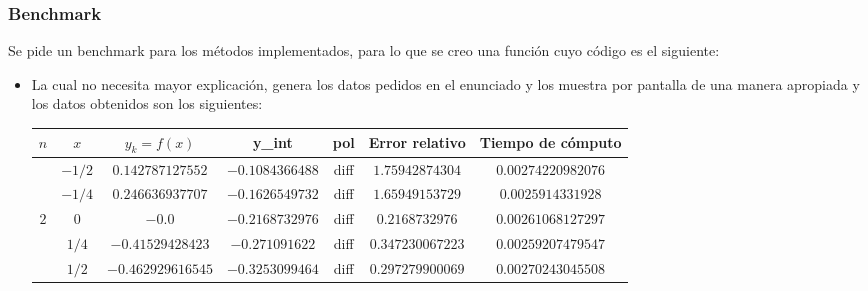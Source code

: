 \documentclass[letter, 10pt]{article}
\begin{document}
\subsubsection{Benchmark} Se pide un benchmark para los m\'etodos implementados, para lo que se creo una funci\'on cuyo c\'odigo es el siguiente:
\begin{itemize}
\begin{python}
def benchmark():
    
    X = [-0.5,-0.25,0.0,0.25,0.5]
    interp_methods = ['diff','spl']
    
    for m in range(1,6):
        for j in interp_methods:
            for i in X:
                
                n = 2**m
                y_real = get_Yreal(i)
                y_int = inter_pol(i,n,j)
                
                if y_real != 0:
                    error_rel = abs((y_real - y_int)/y_real)
                else:
                    error_rel = abs(y_real - y_int)
                
                comp_time = t.timeit("inter_pol(x_int,n,pol)",setup='x_int='+str(i)+'; 
n='+str(n)+'; pol="'+j+'"; from __main__ import inter_pol',number=10)
\end{python}

\newpage

\begin{python}
                if y_real == 0:
                    print 'N:',n,' X:',i,' Y_k:',y_real,'            Y_int:',y_int,' pol:',j
,' Error Relativo:',error_rel,' Tiempo de computo:',comp_time
                else:
                    print 'N:',n,' X:',i,' Y_k:',y_real,' Y_int:',y_int,' pol:',j
,' Error Relativo:',error_rel,' Tiempo de computo:',comp_time
                    
            print ''
\end{python}
\item La cual no necesita mayor explicaci\'on, genera los datos pedidos en el enunciado y los muestra por pantalla de una manera apropiada y los datos obtenidos son los siguientes:

\begin{center}
	\begin{tabular}{|c|c|c|c|c|c|c|}
		\hline
		$n$ & $x$ & $y_k = f(x)$ & y\_int & pol & \textbf{Error relativo} & \textbf{Tiempo de c\'omputo} \\
		\hline \hline
		
			& $ -1/2 $ & $ 0.142787127552 $ & $ -0.1084366488 $ &  diff  & $ 1.75942874304 $ & $ 0.00274220982076 $ \\ 
			& $ -1/4 $ & $ 0.246636937707 $ & $ -0.1626549732 $ &  diff  & $ 1.65949153729 $ & $ 0.0025914331928 $ \\ 
		$2$ & $ 0 $ & $ -0.0 $ & $ -0.2168732976 $ &  diff  & $ 0.2168732976 $ & $ 0.00261068127297 $ \\ 
			& $ 1/4 $ & $ -0.41529428423 $ & $ -0.271091622 $ &  diff  & $ 0.347230067223 $ & $ 0.00259207479547 $ \\ 
			& $ 1/2 $ & $ -0.462929616545 $ & $ -0.3253099464 $ &  diff  & $ 0.297279900069 $ & $ 0.00270243045508 $ \\
		\hline
		

\end{tabular}
\end{center}
\end{itemize}
\end{document}
